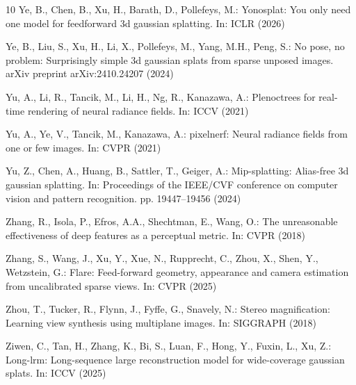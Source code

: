 \documentclass[runningheads]{llncs}
\begin{document}
\begin{thebibliography}{10}
Ye, B., Chen, B., Xu, H., Barath, D., Pollefeys, M.: Yonosplat: You only need one model for feedforward 3d gaussian splatting. In: ICLR (2026)

Ye, B., Liu, S., Xu, H., Li, X., Pollefeys, M., Yang, M.H., Peng, S.: No pose, no problem: Surprisingly simple 3d gaussian splats from sparse unposed images. arXiv preprint arXiv:2410.24207  (2024)

Yu, A., Li, R., Tancik, M., Li, H., Ng, R., Kanazawa, A.: Plenoctrees for real-time rendering of neural radiance fields. In: ICCV (2021)

Yu, A., Ye, V., Tancik, M., Kanazawa, A.: pixelnerf: Neural radiance fields from one or few images. In: CVPR (2021)

Yu, Z., Chen, A., Huang, B., Sattler, T., Geiger, A.: Mip-splatting: Alias-free 3d gaussian splatting. In: Proceedings of the IEEE/CVF conference on computer vision and pattern recognition. pp. 19447--19456 (2024)

Zhang, R., Isola, P., Efros, A.A., Shechtman, E., Wang, O.: The unreasonable effectiveness of deep features as a perceptual metric. In: CVPR (2018)

Zhang, S., Wang, J., Xu, Y., Xue, N., Rupprecht, C., Zhou, X., Shen, Y., Wetzstein, G.: Flare: Feed-forward geometry, appearance and camera estimation from uncalibrated sparse views. In: CVPR (2025)

Zhou, T., Tucker, R., Flynn, J., Fyffe, G., Snavely, N.: Stereo magnification: Learning view synthesis using multiplane images. In: SIGGRAPH (2018)

Ziwen, C., Tan, H., Zhang, K., Bi, S., Luan, F., Hong, Y., Fuxin, L., Xu, Z.: Long-lrm: Long-sequence large reconstruction model for wide-coverage gaussian splats. In: ICCV (2025)

\end{thebibliography}
\end{document}
